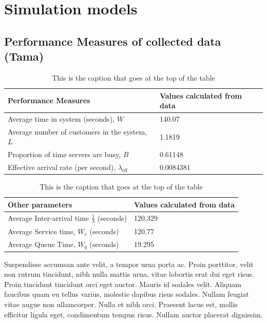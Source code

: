 \documentclass{article}
\begin{document}
\section{Simulation models}

\subsection{Performance Measures of collected data (Tama)}

\begin{table}[h!]
    \centering
    \caption{This is the caption that goes at the top of the table}
    \begin{tabu}{*{2}{X[c]}}
        \toprule
        \textbf{Performance Measures} & \textbf{Values calculated from data}\\
        \midrule
        Average time in system (seconds), $W$   & 140.07 \\
        Average number of customers in the system, $L$ & 1.1819\\
        Proportion of time servers are busy, $B$ & 0.61148  \\
        Effective arrival rate (per second), $\lambda_{\text{eff}}$ & 0.0084381\\
        \bottomrule
    \end{tabu}
    \label{tab:Original Data PF}
\end{table}

\begin{table}[h!]
    \centering
    \caption{This is the caption that goes at the top of the table}
    \begin{tabu}{*{2}{X[c]}}
        \toprule
        \textbf{Other parameters} & \textbf{Values calculated from data} \\
        \midrule
        Average Inter-arrival time $\frac{1}{\lambda}$ (seconds) & 120.329  \\
        Average Service time, $W_s$ (seconds) & 120.77  \\
        Average Queue Time, $W_q$ (seconds) & 19.295  \\
        \bottomrule
    \end{tabu}
    \label{tab:Original Data Other}
\end{table}



Suspendisse accumsan ante velit, a tempor urna porta ac. Proin porttitor, velit non rutrum tincidunt, nibh nulla mattis urna, vitae lobortis erat dui eget risus. Proin tincidunt tincidunt orci eget auctor. Mauris id sodales velit. Aliquam faucibus quam eu tellus varius, molestie dapibus risus sodales. Nullam feugiat vitae augue non ullamcorper. Nulla et nibh orci. Praesent lacus est, mollis efficitur ligula eget, condimentum tempus risus. Nullam auctor placerat dignissim.
\end{document}
